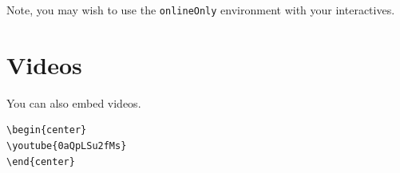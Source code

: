 \documentclass{ximera}
\begin{document}
Note, you may wish to use the \verb|onlineOnly| environment with your
interactives.

\section{Videos}

You can also embed  videos.
\begin{center}
\end{center}

\begin{verbatim}
\begin{center}
\youtube{0aQpLSu2fMs}
\end{center}
\end{verbatim}
\end{document}

